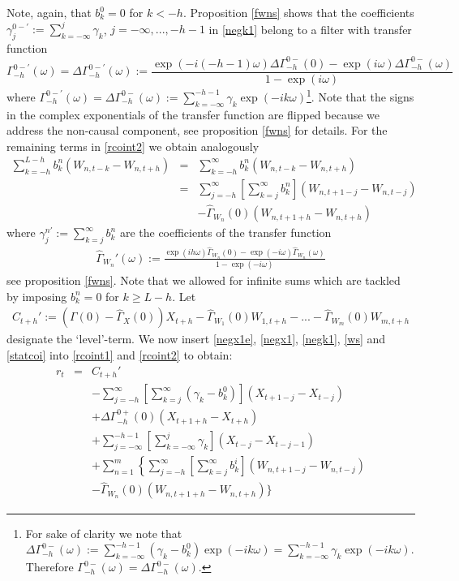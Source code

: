 \documentclass[11pt]{article}
\begin{document}
Note, again, that $b_k^0=0$ for $k<-h$. Proposition  \ref{fwns} shows that the coefficients $\gamma_j^{0-'}:=\sum_{k=-\infty}^j\gamma_k$, $j=-\infty,...,-h-1$ in \ref{negk1} belong to a filter with transfer function
\begin{equation}\label{intfil123}
\Gamma_{-h}^{0-'}(\omega)=\Delta\Gamma_{-h}^{0-'}(\omega):=\frac{\exp(-i(-h-1)\omega)\Delta\Gamma_{-h}^{0-}(0)-\exp(i\omega)\Delta\Gamma_{-h}^{0-}(\omega)}{1-\exp(i\omega)}
\end{equation}
where $\Gamma_{-h}^{0-'}(\omega)=\Delta \Gamma_{-h}^{0-}(\omega):=\sum_{k=-\infty}^{-h-1} \gamma_k\exp(-ik\omega)$\footnote{For sake of clarity we note that $\Delta \Gamma_{-h}^{0-}(\omega):=\sum_{k=-\infty}^{-h-1} (\gamma_k-b_k^0)\exp(-ik\omega)=\sum_{k=-\infty}^{-h-1} \gamma_k\exp(-ik\omega)$. Therefore $\Gamma_{-h}^{0-}(\omega)=\Delta \Gamma_{-h}^{0-}(\omega)$.}. Note that the signs in the complex exponentials of the transfer function are flipped because we address the non-causal component, see proposition  \ref{fwns} for details. For the remaining terms in \ref{rcoint2} we obtain analogously
\begin{eqnarray}
\sum_{k=-h}^{L-h}b_{k}^n (W_{n,t-k}-W_{n,t+h})&=&\sum_{k=-h}^{\infty}b_{k}^n (W_{n,t-k}-W_{n,t+h})\nonumber\\
&=&\sum_{j=-h}^\infty
\left[\sum_{k=j}^\infty b_k^n\right]
(W_{n,t+1-j}-W_{n,t-j})\nonumber\\
&&-\hat{\Gamma}_{W_n}(0)(W_{n,t+1+h}-W_{n,t+h})\label{ws}
\end{eqnarray}
where $\gamma_j^{n'}:=\sum_{k=j}^\infty b_k^n$ are the
coefficients of the transfer function
\begin{eqnarray}\label{trans3}
\hat{\Gamma}_{W_n}'(\omega):=\frac{\exp(ih\omega)\hat{\Gamma}_{W_n}(0)-\exp(-i\omega)\hat{\Gamma}_{W_n}(\omega)}{1-\exp(-i\omega)}
\end{eqnarray}
see proposition \ref{fwns}. Note that we allowed for infinite sums which are tackled by imposing $b_k^n=0$ for $k\geq L-h$. Let  
\begin{eqnarray}\label{statcoi}
C_{t+h}':=(\Gamma(0)-\hat{\Gamma}_X(0))X_{t+h}-\hat{\Gamma}_{W_1}(0)W_{1,t+h}-...-\hat{\Gamma}_{W_m}(0)W_{m,t+h}
\end{eqnarray}
designate the `level'-term. We now insert  \ref{negx1e},  \ref{negx1}, \ref{negk1}, \ref{ws} and \ref{statcoi} into \ref{rcoint1} and \ref{rcoint2} to obtain:
\begin{eqnarray}
r_t&=&C_{t+h}'\label{unidectd}\\
&&-\sum_{j=-h}^\infty
\left[\sum_{k=j}^\infty({\gamma}_{k}-b_k^0)\right]
(X_{t+1-j}-X_{t-j})\nonumber\\
&&+\Delta\Gamma_{-h}^{0+}(0)
(X_{t+1+h}-X_{t+h})\nonumber\\
&&+\sum_{j=-\infty}^{-h-1}\left[\sum_{k=-\infty}^j\gamma_k\right](X_{t-j}-X_{t-j-1})\nonumber\\
&&+\sum_{n=1}^m\left\{\sum_{j=-h}^\infty
\left[\sum_{k=j}^\infty b_k^i\right]
(W_{n,t+1-j}-W_{n,t-j})\right.\nonumber\\
&&-\hat{\Gamma}_{W_n}(0)(W_{n,t+1+h}-W_{n,t+h})\Bigg\}\nonumber
\end{eqnarray}
\end{document}
